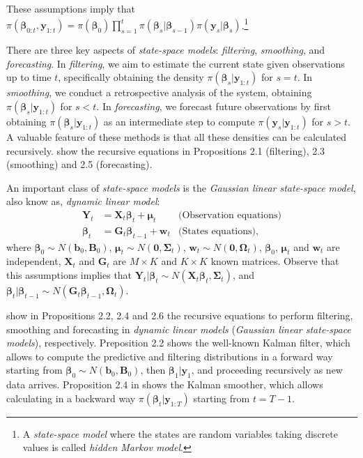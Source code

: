 These assumptions imply that $\pi(\bm{\beta}_{0:t},\bm{y}_{1:t})=\pi(\bm{\beta}_0)\prod_{s=1}^{t}\pi(\bm{\beta}_s|\bm{\beta}_{s-1})\pi(\bm{y}_s|\bm{\beta}_s)$.\footnote{A \textit{state-space model} where the states are random variables taking discrete values is called \textit{hidden Markov model}.}

There are three key aspects of \textit{state-space models}: \textit{filtering}, \textit{smoothing}, and \textit{forecasting}. In \textit{filtering}, we aim to estimate the current state given observations up to time $t$, specifically obtaining the density $\pi(\bm{\beta}_{s}|\bm{y}_{1:t})$ for $s = t$. In \textit{smoothing}, we conduct a retrospective analysis of the system, obtaining $\pi(\bm{\beta}_{s}|\bm{y}_{1:t})$ for $s < t$. In \textit{forecasting}, we forecast future observations by first obtaining $\pi(\bm{\beta}_{s}|\bm{y}_{1:t})$ as an intermediate step to compute $\pi(\bm{y}_{s}|\bm{y}_{1:t})$ for $s > t$. A valuable feature of these methods is that all these densities can be calculated recursively. \cite{petris2009dynamic} show the recursive equations in Propositions 2.1 (filtering), 2.3 (smoothing) and 2.5 (forecasting).

An important class of \textit{state-space models} is the \textit{Gaussian linear state-space model}, also know as, \textit{dynamic linear model}:
\begin{align*}
	\bm{Y}_t&=\bm{X}_t\bm{\beta}_t+\bm{\mu}_t& \text{(Observation equations)}\\
	\bm{\beta}_t&=\bm{G}_t\bm{\beta}_{t-1}+\bm{w}_t & \text{(States equations)},
\end{align*}
where $\bm{\beta}_0\sim N(\bm{b}_0,\bm{B}_0)$, $\bm{\mu}_t\sim N(\bm{0}, \bm{\Sigma}_t)$, $\bm{w}_t\sim N(\bm{0}, \bm{\Omega}_t)$, $\bm{\beta}_0$, $\bm{\mu}_t$ and $\bm{w}_t$ are independent, $\bm{X}_t$ and $\bm{G}_t$ are $M\times K$ and $K\times K$ known matrices. Observe that this assumptions implies that $\bm{Y}_t|\bm{\beta}_t\sim N(\bm{X}_t\bm{\beta}_t,\bm{\Sigma}_t)$, and $\bm{\beta}_t|\bm{\beta}_{t-1}\sim N(\bm{G}_t\bm{\beta}_{t-1},\bm{\Omega}_t)$.

\cite{petris2009dynamic} show in Propositions 2.2, 2.4 and 2.6 the recursive equations to perform filtering, smoothing and forecasting in \textit{dynamic linear models} (\textit{Gaussian linear state-space models}), respectively. Preposition 2.2 shows the well-known Kalman filter, which allows to compute the predictive and filtering distributions in a forward way starting from $\bm{\beta}_0\sim N(\bm{b}_0,\bm{B}_0)$, then $\bm{\beta}_1|\bm{y}_1$, and proceeding recursively as new data arrives. Proposition 2.4 in \cite{petris2009dynamic} shows the Kalman smoother, which allows calculating in a backward way $\pi(\bm{\beta}_t|\bm{y}_{1:T})$ starting from $t=T-1$.

